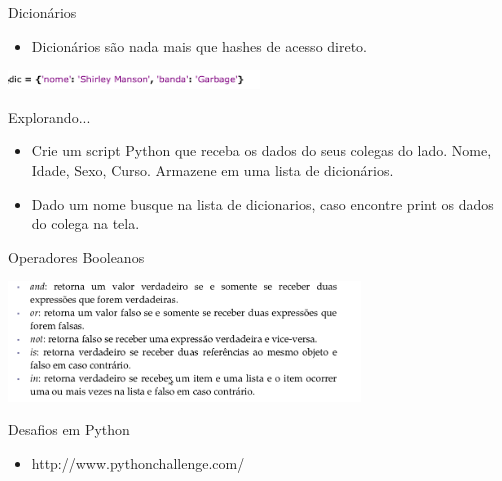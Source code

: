 \documentclass{beamer}
\begin{document}
\begin{frame}{Dicion\'arios}
 \begin{itemize}
  \item Dicion\'arios s\~ao nada mais  que hashes de acesso direto.
 \end{itemize}

  \begin{center}
   \includegraphics[width=0.5\textwidth]{images/dicionario.png}
\end{center}
\end{frame}

\begin{frame}{Explorando...}
 \begin{itemize}
  \item Crie um script Python que receba os dados do seus colegas do lado. Nome, Idade, Sexo, Curso. Armazene em uma lista de dicion\'arios. 
  \item Dado um nome busque na lista de dicionarios, caso encontre print os dados do colega na tela.
  
 \end{itemize}

\end{frame}

\begin{frame}{Operadores Booleanos}
  \begin{center}
   \includegraphics[width=0.7\textwidth]{images/booleanos.png}
\end{center}
\end{frame}

\begin{frame}{Desafios em Python}
\begin{itemize}
 \item http://www.pythonchallenge.com/
\end{itemize}

 
\end{frame}
\end{document}
